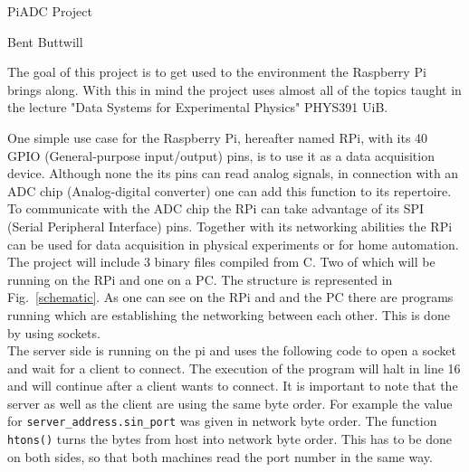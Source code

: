\documentclass[12pt,paper=a4,twoside]{scrartcl}
\numberwithin{equation}{section}
\begin{document}
\newcommand{\loadVOne}[1]{\DTLgetvalueforkey{\dataValueOne}{thevalue}{mydata}{thekey}{#1}}
\newcommand{\loadVTwo}[1]{\DTLgetvalueforkey{\dataValueTwo}{thevalue}{mydata}{thekey}{#1}}


\vspace*{1cm}
\Large
\begin{center}
PiADC Project
\end{center}
\vspace{3mm}
\normalsize
\begin{center}
Bent Buttwill
\end{center}
\vspace{2cm}
The goal of this project is to get used to the environment the Raspberry Pi brings along. With this in mind the project uses almost all of the topics taught in the lecture "Data Systems for Experimental Physics" PHYS391 UiB. 

One simple use case for the Raspberry Pi, hereafter named RPi, with its 40 GPIO (General-purpose input/output) pins, is to use it as a data acquisition device.
 Although none the its pins can read analog signals, in connection with an ADC chip (Analog-digital converter) one can add this function to its repertoire. 
To communicate with the ADC chip the RPi can take advantage of its SPI (Serial Peripheral Interface) pins. Together with its networking abilities the RPi can be used for data acquisition in physical experiments or for home automation.
\vspace{5mm}\\
The project will include 3 binary files compiled from C. Two of which will be running on the RPi and one on a PC. The structure is represented in Fig.~\ref{schematic}. As one can see on the RPi and and the PC there are programs running which are establishing the networking between each other. This is done by using sockets.
\vspace{10mm}\\
The server side is running on the pi and uses the following code to open a socket and wait for a client to connect. The execution of the program will halt in line 16 and will continue after a client wants to connect. It is important to note that the server as well as the client are using the same byte order. For example the value for \verb+server_address.sin_port+ was given in network byte order. The function \verb+htons()+ turns the bytes from host into network byte order. This has to be done on both sides, so that both machines read the port number in the same way.
\end{document}
